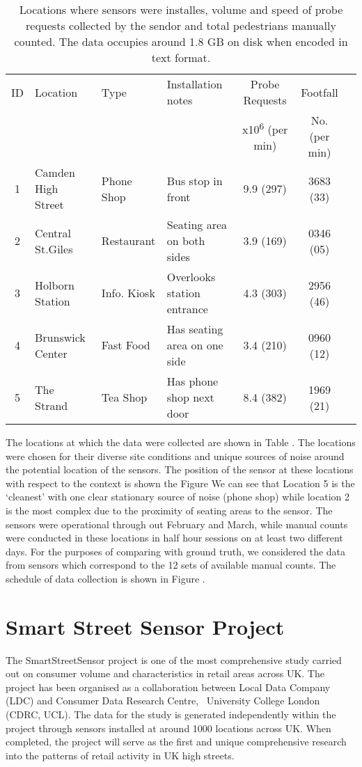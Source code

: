 \begin{table}
    \caption{Locations where sensors were installes, volume and speed of probe
    requests collected by the sendor and total pedestrians manually counted. The data occupies around 1.8 GB on disk when encoded in text format.}
    {\begin{tabular}{clllccc} 
     ID & Location & Type & Installation notes & Probe Requests & Footfall\\
     & & & & x10\textsuperscript{6} (per min) & No. (per min)\\
     1 & Camden High Street & Phone Shop & Bus stop in front & 9.9 (297) & 3683 (33)\\
     2 & Central St.Giles & Restaurant & Seating area on both sides & 3.9 (169) & 0346 (05)\\
     3 & Holborn Station & Info. Kiosk & Overlooks station entrance & 4.3 (303) & 2956 (46)\\
     4 & Brunswick Center & Fast Food & Has seating area on one side & 3.4 (210) & 0960 (12)\\
     5 & The Strand & Tea Shop & Has phone shop next door & 8.4 (382) & 1969 (21)\\
    \end{tabular}}
    \label{locations-table}
\end{table}

The locations at which the data were collected are shown in Table .
The locations were chosen for their diverse site conditions and unique sources of noise around the potential location of the sensors.
The position of the sensor at these locations with respect to the context is shown the Figure 
We can see that Location 5 is the `cleanest' with one clear stationary source of noise (phone shop) while location 2 is the most complex due to the proximity of seating areas to the sensor.
The sensors were operational through out February and March, while manual counts were conducted in these locations in half hour sessions on at least two different days.
For the purposes of comparing with ground truth, we considered the data from sensors which correspond to the 12 sets of available manual counts.
The schedule of data collection is shown in Figure .


\section{Smart Street Sensor Project}

The SmartStreetSensor project is one of the most comprehensive study carried out on consumer volume and characteristics in retail areas across UK.
The project has been organised as a collaboration between Local Data Company (LDC) and Consumer Data Research Centre,  University College London (CDRC, UCL).
The data for the study is generated independently within the project through sensors installed at around 1000 locations across UK.
When completed, the project will serve as the first and unique comprehensive research into the patterns of retail activity in UK high streets.

